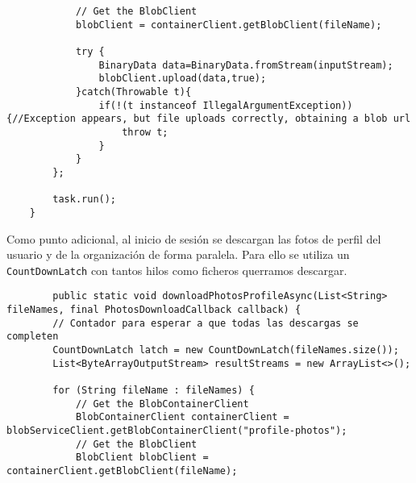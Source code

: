 \begin{itemize}
\begin{lstlisting}
            // Get the BlobClient
            blobClient = containerClient.getBlobClient(fileName);

            try {
                BinaryData data=BinaryData.fromStream(inputStream);
                blobClient.upload(data,true);
            }catch(Throwable t){
                if(!(t instanceof IllegalArgumentException)){//Exception appears, but file uploads correctly, obtaining a blob url
                    throw t;
                }
            }
        };

        task.run();
    }
    \end{lstlisting}
    Como punto adicional, al inicio de sesión se descargan las fotos de perfil del usuario y de la organización de forma paralela. Para ello se utiliza un \texttt{CountDownLatch} con tantos hilos como ficheros querramos descargar.
    \begin{lstlisting}
        public static void downloadPhotosProfileAsync(List<String> fileNames, final PhotosDownloadCallback callback) {
        // Contador para esperar a que todas las descargas se completen
        CountDownLatch latch = new CountDownLatch(fileNames.size());
        List<ByteArrayOutputStream> resultStreams = new ArrayList<>();

        for (String fileName : fileNames) {
            // Get the BlobContainerClient
            BlobContainerClient containerClient = blobServiceClient.getBlobContainerClient("profile-photos");
            // Get the BlobClient
            BlobClient blobClient = containerClient.getBlobClient(fileName);


\end{lstlisting}
\end{itemize}
